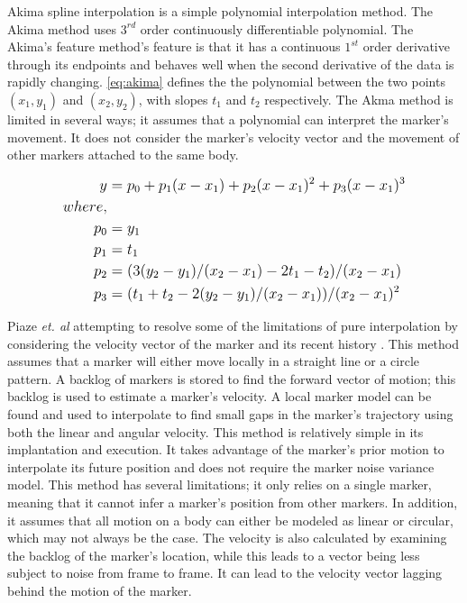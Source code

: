 Akima spline interpolation \cite{wang2014real} is a simple polynomial interpolation method. The Akima method uses $3^{rd}$ order continuously differentiable polynomial. The Akima's feature method's feature is that it has a continuous $1^{st}$  order derivative through its endpoints and behaves well when the second derivative of the data is rapidly changing. \autoref{eq:akima} defines the the polynomial between the two points $(x_{1}, y_{1})$ and $(x_{2}, y_{2})$, with slopes $t_{1}$ and $t_{2}$ respectively. The Akma method is limited in several ways; it assumes that a polynomial can interpret the marker's movement. It does not consider the marker's velocity vector and the movement of other markers attached to the same body. 

\begin{equation} \label{eq:akima}
\large
\begin{split}
        y &= p_{0} + p_{1}(x - x_{1}) + p_{2}(x - x_{1})^{2} + p_{3}(x - x_{1})^{3} \\
        where, \\
          p_{0} &= y_{1} \\
    p_{1} &= t_{1} \\
    p_{2} &= (3(y_{2} - y_{1})/(x_{2} - x_{1}) - 2t_{1} - t_{2})/(x_{2} - x_{1}) \\
    p_{3} &= (t_{1} + t_{2} - 2(y_{2} - y_{1})/(x_{2} - x_{1}))/(x_{2} - x_{1})^{2}
\end{split}
\end{equation}

Piaze \textit{et. al} attempting to resolve some of the limitations of pure interpolation by considering the velocity vector of the marker and its recent history \cite{piazza2009towards}. This method assumes that a marker will either move locally in a straight line or a circle pattern. A backlog of markers is stored to find the forward vector of motion; this backlog is used to estimate a marker's velocity. A local marker model can be found and used to interpolate to find small gaps in the marker's trajectory using both the linear and angular velocity. This method is relatively simple in its implantation and execution. It takes advantage of the marker's prior motion to interpolate its future position and does not require the marker noise variance model. This method has several limitations; it only relies on a single marker, meaning that it cannot infer a marker's position from other markers. In addition, it assumes that all motion on a body can either be modeled as linear or circular, which may not always be the case. The velocity is also calculated by examining the backlog of the marker's location, while this leads to a vector being less subject to noise from frame to frame. It can lead to the velocity vector lagging behind the motion of the marker. 


